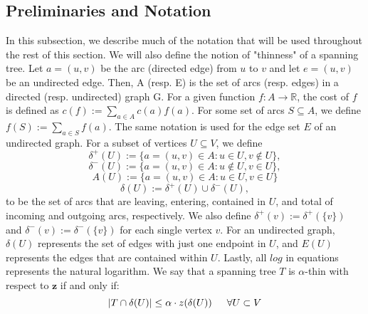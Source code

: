 \documentclass[oneside]{projectpaper} %
\begin{document}
\subsection{Preliminaries and Notation}
In this subsection, we describe much of the notation that will be used throughout the rest of this section. We will also define the notion of "thinness" of a spanning tree. \newline
\indent Let $a = (u, v)$ be the arc (directed edge) from $u$ to $v$ and let $e = (u, v)$ be an undirected edge. Then, A (resp. E) is the set of arcs (resp. edges) in a directed (resp. undirected) graph G. \newline
\indent For a given function $f : A \rightarrow \mathbb{R}$, the cost of $f$ is defined as $c(f) := \sum\limits_{a \in A}c(a)f(a)$. For some set of arcs $S \subseteq A$, we define $f(S) := \sum\limits_{a \in S}f(a)$. The same notation is used for the edge set $E$ of an undirected graph. \newline
\indent For a subset of vertices $U \subseteq V$, we define
\begin{equation*}
  \delta^{+}(U) := \{a = (u, v) \in A : u \in U, v \notin U\},
\end{equation*}
\begin{equation*}
  \delta^{-}(U) := \{a = (u, v) \in A : u \notin U, v \in U\},
\end{equation*}
\begin{equation*}
  A(U) := \{a = (u, v) \in A : u \in U, v \in U\}
\end{equation*}
\begin{equation*}
  \delta(U) := \delta^{+}(U) \cup \delta^{-}(U),
\end{equation*}
to be the set of arcs that are leaving, entering, contained in $U$, and total of incoming and outgoing arcs, respectively. We also define $\delta^{+}(v) :=\delta^{+}(\{v\})$ and $\delta^{-}(v) :=\delta^{-}(\{v\})$ for each single vertex $v$. For an undirected graph, $\delta(U)$ represents the set of edges with just one endpoint in $U$, and $E(U)$ represents the edges that are contained within $U$. Lastly, all $log$ in equations represents the natural logarithm. \newline
\indent We say that a spanning tree $T$ is $\alpha$-thin with respect to $\textbf{z}$  if and only if: 
\begin{equation*}
|T \cap \delta(U)| \leq \alpha \cdot z(\delta(U)) \indent \forall U \subset V
\end{equation*}
\end{document}
